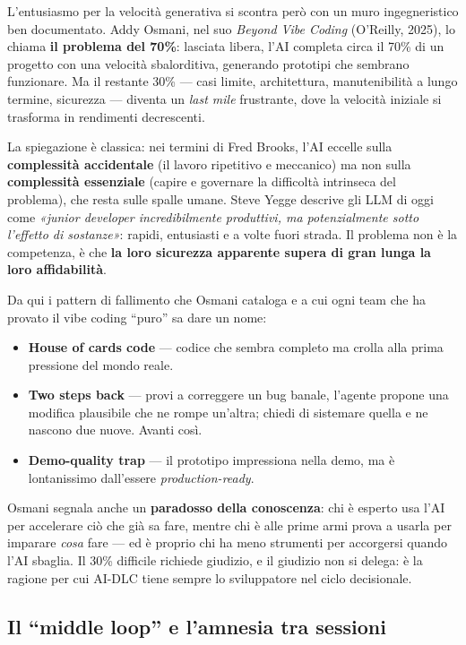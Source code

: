 L'entusiasmo per la velocità generativa si scontra però con un muro ingegneristico ben documentato. Addy Osmani, nel suo \textit{Beyond Vibe Coding} (O'Reilly, 2025), lo chiama \textbf{il problema del 70\%}: lasciata libera, l'AI completa circa il 70\% di un progetto con una velocità sbalorditiva, generando prototipi che sembrano funzionare. Ma il restante 30\% --- casi limite, architettura, manutenibilità a lungo termine, sicurezza --- diventa un \textit{last mile} frustrante, dove la velocità iniziale si trasforma in rendimenti decrescenti.

La spiegazione è classica: nei termini di Fred Brooks, l'AI eccelle sulla \textbf{complessità accidentale} (il lavoro ripetitivo e meccanico) ma non sulla \textbf{complessità essenziale} (capire e governare la difficoltà intrinseca del problema), che resta sulle spalle umane. Steve Yegge descrive gli LLM di oggi come \textit{«junior developer incredibilmente produttivi, ma potenzialmente sotto l'effetto di sostanze»}: rapidi, entusiasti e a volte fuori strada. Il problema non è la competenza, è che \textbf{la loro sicurezza apparente supera di gran lunga la loro affidabilità}.

Da qui i pattern di fallimento che Osmani cataloga e a cui ogni team che ha provato il vibe coding ``puro'' sa dare un nome:

\begin{itemize}
  \item \textbf{House of cards code} --- codice che sembra completo ma crolla alla prima pressione del mondo reale.
  \item \textbf{Two steps back} --- provi a correggere un bug banale, l'agente propone una modifica plausibile che ne rompe un'altra; chiedi di sistemare quella e ne nascono due nuove. Avanti così.
  \item \textbf{Demo-quality trap} --- il prototipo impressiona nella demo, ma è lontanissimo dall'essere \textit{production-ready}.
\end{itemize}

Osmani segnala anche un \textbf{paradosso della conoscenza}: chi è esperto usa l'AI per accelerare ciò che già sa fare, mentre chi è alle prime armi prova a usarla per imparare \textit{cosa} fare --- ed è proprio chi ha meno strumenti per accorgersi quando l'AI sbaglia. Il 30\% difficile richiede giudizio, e il giudizio non si delega: è la ragione per cui AI-DLC tiene sempre lo sviluppatore nel ciclo decisionale.

\subsection*{Il ``middle loop'' e l'amnesia tra sessioni}

